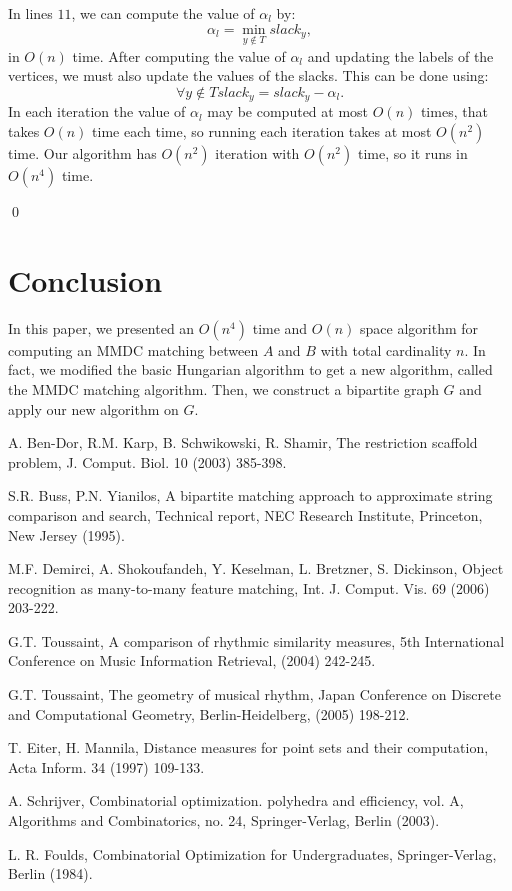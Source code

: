 \documentclass[preprint,12pt]{elsarticle}
\begin{document}
In lines $11$, we can compute the value of $\alpha_l$ by:
$$\alpha_l=\min_{y \notin T}slack_y,$$
in $O(n)$ time. After computing the value of $\alpha_l$ and updating the labels of the vertices, we must also update the values of the slacks. This can be done using:
$$\forall y \notin T slack_y=slack_y-\alpha_l.$$ 
In each iteration the value of $\alpha_l$ may be computed at most $O(n)$ times, that takes $O(n)$ time each time, so running each iteration takes at most $O(n^2)$ time.
Our algorithm has $O(n^2)$ iteration with $O(n^2)$ time, so it runs in $O(n^4)$ time. 

\qed



\section{Conclusion}
\label{ConclusionSect}
In this paper, we presented an $O(n^4)$ time and $O(n)$ space algorithm for computing an MMDC matching between $A$ and $B$ with total cardinality $n$. In fact, we modified the basic Hungarian algorithm to get a new algorithm, called the MMDC matching algorithm. Then, we construct a bipartite graph $G$ and apply our new algorithm on $G$.

\begin{thebibliography}{8}


A. Ben-Dor, R.M. Karp, B. Schwikowski, R. Shamir, The restriction scaffold problem, J. Comput. Biol. 10 (2003) 385-398.

S.R. Buss, P.N. Yianilos, A bipartite matching approach to approximate string comparison and search, Technical report, NEC Research Institute, Princeton, New Jersey (1995).

M.F. Demirci, A. Shokoufandeh, Y. Keselman, L. Bretzner, S. Dickinson, Object recognition as many-to-many feature matching, Int. J. Comput. Vis. 69 (2006) 203-222.

G.T. Toussaint, A comparison of rhythmic similarity measures, 5th International Conference on Music Information Retrieval, (2004) 242-245.


G.T. Toussaint, The geometry of musical rhythm, Japan Conference on Discrete and Computational Geometry, Berlin-Heidelberg, (2005) 198-212.

T. Eiter, H. Mannila, Distance measures for point sets and their computation, Acta Inform. 34 (1997) 109-133.

A. Schrijver, Combinatorial optimization. polyhedra and efficiency, vol. A, Algorithms and Combinatorics, no. 24, Springer-Verlag, Berlin (2003).

 L. R. Foulds, Combinatorial Optimization for Undergraduates, Springer-Verlag, Berlin (1984).

\end{thebibliography}
\end{document}
